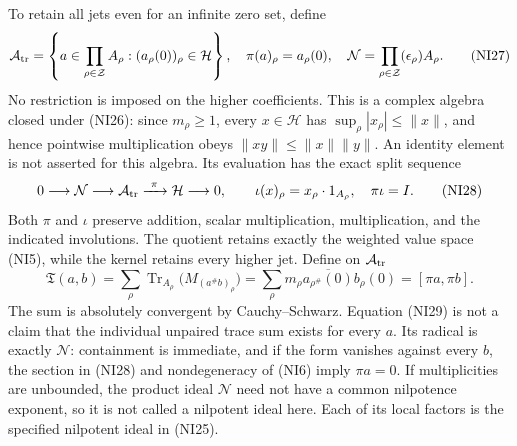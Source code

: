 \documentclass[
  10pt,
  a4paper,
]{article}
\begin{document}
To retain all jets even for an infinite zero set, define \[
\mathcal A_{\rm tr}
=\left\{a\in\prod_{\rho\in\mathcal Z}A_\rho:
(a_\rho(0))_\rho\in\mathcal H\right\},\quad
\pi(a)_\rho=a_\rho(0),\quad
\mathcal N=\prod_{\rho\in\mathcal Z}(\epsilon_\rho)A_\rho.
\tag{NI27}
\] No restriction is imposed on the higher coefficients. This is a
complex algebra closed under (NI26): since \(m_\rho\ge1\), every
\(x\in\mathcal H\) has \(\sup_\rho|x_\rho|\le\|x\|\), and hence
pointwise multiplication obeys \(\|xy\|\le\|x\|\|y\|\). An identity
element is not asserted for this algebra. Its evaluation has the exact
split sequence \[
0\longrightarrow\mathcal N\longrightarrow\mathcal A_{\rm tr}
\xrightarrow{\ \pi\ }\mathcal H\longrightarrow0,
\qquad
\iota(x)_\rho=x_\rho\cdot1_{A_\rho},\quad\pi\iota=I.
\tag{NI28}
\] Both \(\pi\) and \(\iota\) preserve addition, scalar multiplication,
multiplication, and the indicated involutions. The quotient retains
exactly the weighted value space (NI5), while the kernel retains every
higher jet. Define on \(\mathcal A_{\rm tr}\) \[
\mathfrak T(a,b)
=\sum_\rho\operatorname{Tr}_{A_\rho}
\bigl(M_{(a^\#b)_\rho}\bigr)
=\sum_\rho m_\rho\overline{a_{\rho^\#}(0)}b_\rho(0)
=[\pi a,\pi b].
\tag{NI29}
\] The sum is absolutely convergent by Cauchy--Schwarz. Equation (NI29)
is not a claim that the individual unpaired trace sum exists for every
\(a\). Its radical is exactly \(\mathcal N\): containment is immediate,
and if the form vanishes against every \(b\), the section in (NI28) and
nondegeneracy of (NI6) imply \(\pi a=0\). If multiplicities are
unbounded, the product ideal \(\mathcal N\) need not have a common
nilpotence exponent, so it is not called a nilpotent ideal here. Each of
its local factors is the specified nilpotent ideal in (NI25).
\end{document}
